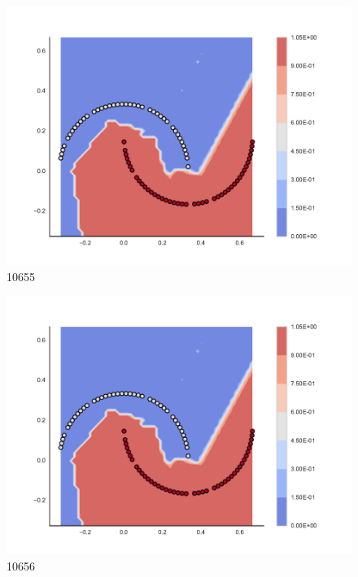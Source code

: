 \begin{subfigure}[b]{0.09\textwidth}
    \includegraphics[clip, trim=2.35cm 1.75cm 4.5cm 0cm,width=\textwidth]{img/convergence/10655.pdf}
    \caption{10655}
    \label{fig:convergence_10655}
\end{subfigure}
%
\begin{subfigure}[b]{0.09\textwidth}
    \includegraphics[clip, trim=2.35cm 1.75cm 4.5cm 0cm,width=\textwidth]{img/convergence/10656.pdf}
    \caption{10656}
    \label{fig:convergence_10656}
\end{subfigure}
%
